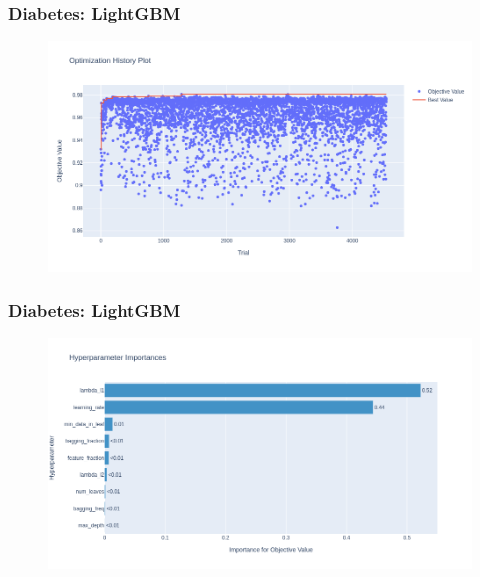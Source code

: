 \documentclass{beamer}
\begin{document}
\begin{frame}
\frametitle{Diabetes: LightGBM}
\begin{figure}[H]

 \label{fig:op:dia:trials:lgbm}
 \centering
 \includegraphics[scale=0.3]{optuna_lgbm_dia.png}
\end{figure}
\end{frame}
\begin{frame}
\frametitle{Diabetes: LightGBM}
\begin{figure}[H]

 \label{fig:op:dia:impo:lgbm}
 \centering
 \includegraphics[scale=0.3]{importance_lgbm_dia.png}
\end{figure}
\end{frame}
\end{document}
